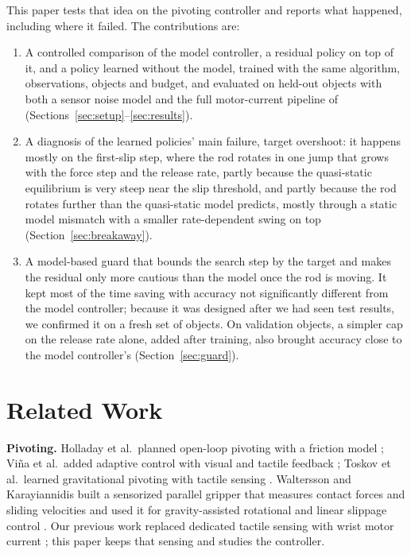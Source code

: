 \documentclass[11pt]{article}
\begin{document}
This paper tests that idea on the pivoting controller and reports what happened, including where it failed. The contributions are:
\begin{enumerate}
\item A controlled comparison of the model controller, a residual policy on top of it, and a policy learned without the model, trained with the same algorithm, observations, objects and budget, and evaluated on held-out objects with both a sensor noise model and the full motor-current pipeline of \cite{aidoo2026a} (Sections~\ref{sec:setup}--\ref{sec:results}).
\item A diagnosis of the learned policies' main failure, target overshoot: it happens mostly on the first-slip step, where the rod rotates in one jump that grows with the force step and the release rate, partly because the quasi-static equilibrium is very steep near the slip threshold, and partly because the rod rotates further than the quasi-static model predicts, mostly through a static model mismatch with a smaller rate-dependent swing on top (Section~\ref{sec:breakaway}).
\item A model-based guard that bounds the search step by the target and makes the residual only more cautious than the model once the rod is moving. It kept most of the time saving with accuracy not significantly different from the model controller; because it was designed after we had seen test results, we confirmed it on a fresh set of objects. On validation objects, a simpler cap on the release rate alone, added after training, also brought accuracy close to the model controller's (Section~\ref{sec:guard}).
\end{enumerate}

\section{Related Work}
\textbf{Pivoting.} Holladay et al.\ planned open-loop pivoting with a friction model \cite{holladay2015}; Vi\~na et al.\ added adaptive control with visual and tactile feedback \cite{vina2016}; Toskov et al.\ learned gravitational pivoting with tactile sensing \cite{toskov2023}. Waltersson and Karayiannidis built a sensorized parallel gripper that measures contact forces and sliding velocities and used it for gravity-assisted rotational and linear slippage control \cite{waltersson2026}. Our previous work replaced dedicated tactile sensing with wrist motor current \cite{aidoo2026a}; this paper keeps that sensing and studies the controller.
\end{document}
